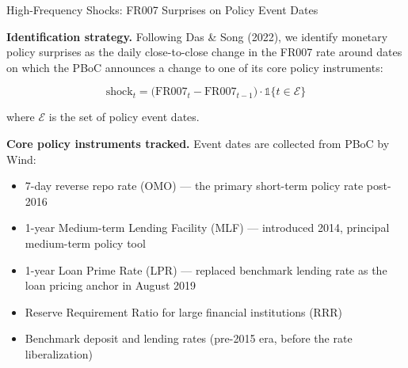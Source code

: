 \documentclass[10pt,aspectratio=169,t]{beamer}
\begin{document}
\begin{frame}{High-Frequency Shocks: FR007 Surprises on Policy Event Dates}
\hypertarget{slide:hfi}{}

\textbf{Identification strategy.} Following Das \& Song (2022), we identify monetary policy surprises as the daily close-to-close change in the FR007 rate around dates on which the PBoC announces a change to one of its core policy instruments:

\vspace{-1em}
\[
\text{shock}_t = \bigl(\text{FR007}_t-\text{FR007}_{t-1}\bigr)\cdot\mathds{1}\{t\in\mathcal{E}\}
\]
\vspace{-1em}

where $\mathcal{E}$ is the set of policy event dates.

\textbf{Core policy instruments tracked.} Event dates are collected from PBoC by Wind:

\begin{itemize}
  \item[$\bullet$] 7-day reverse repo rate (OMO) --- the primary short-term policy rate post-2016
  \item[$\bullet$] 1-year Medium-term Lending Facility (MLF) --- introduced 2014, principal medium-term policy tool
  \item[$\bullet$] 1-year Loan Prime Rate (LPR) --- replaced benchmark lending rate as the loan pricing anchor in August 2019
  \item[$\bullet$] Reserve Requirement Ratio for large financial institutions (RRR)
  \item[$\bullet$] Benchmark deposit and lending rates (pre-2015 era, before the rate liberalization)
\end{itemize}
\end{frame}
\end{document}
